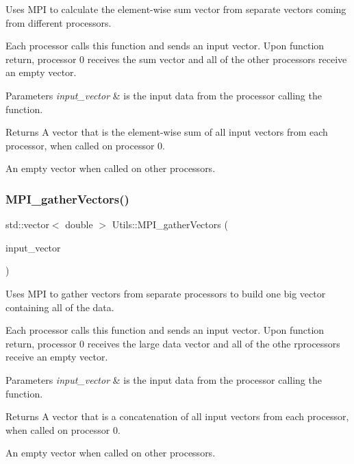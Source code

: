 Uses M\+PI to calculate the element-\/wise sum vector from separate vectors coming from different processors. 

Each processor calls this function and sends an input vector. Upon function return, processor 0 receives the sum vector and all of the other processors receive an empty vector. 
\begin{DoxyParams}{Parameters}
{\em input\+\_\+vector} & is the input data from the processor calling the function. \\
\hline
\end{DoxyParams}
\begin{DoxyReturn}{Returns}
A vector that is the element-\/wise sum of all input vectors from each processor, when called on processor 0. 

An empty vector when called on other processors. 
\end{DoxyReturn}
\mbox{\label{namespace_utils_aee439dad386e2477d34968311b166c85}} 
\subsubsection{\texorpdfstring{M\+P\+I\+\_\+gather\+Vectors()}{MPI\_gatherVectors()}}
{\footnotesize\ttfamily std\+::vector$<$ double $>$ Utils\+::\+M\+P\+I\+\_\+gather\+Vectors (\begin{DoxyParamCaption}\item[{const std\+::vector$<$ double $>$ \&}]{input\+\_\+vector }\end{DoxyParamCaption})}



Uses M\+PI to gather vectors from separate processors to build one big vector containing all of the data. 

Each processor calls this function and sends an input vector. Upon function return, processor 0 receives the large data vector and all of the othe rprocessors receive an empty vector. 
\begin{DoxyParams}{Parameters}
{\em input\+\_\+vector} & is the input data from the processor calling the function. \\
\hline
\end{DoxyParams}
\begin{DoxyReturn}{Returns}
A vector that is a concatenation of all input vectors from each processor, when called on processor 0. 

An empty vector when called on other processors. 
\end{DoxyReturn}
\mbox{\label{namespace_utils_ab76081fb0fa0e9e1633b1b2255db4164}} 
